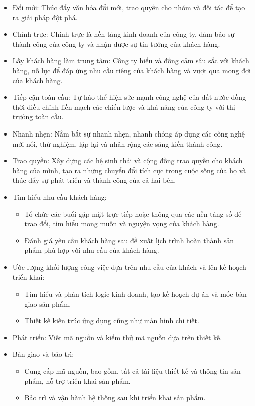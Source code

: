 \documentclass[12pt,a4paper]{report}
\begin{document}
		\hspace{0.3cm}{Nhiệm vụ: Cung cấp các dịch vụ tư vấn công nghệ đẳng cấp thế giới, giúp khách hàng chuyển đổi quy trình, thúc đẩy tăng trưởng và đạt được lợi thế cạnh tranh với các đối thủ khác ngoài thị trường.}
		
		\hspace{0.3cm}{Giá trị cốt lõi của công ty:}
		
		\begin{itemize}
		\item Đổi mới: Thúc đẩy văn hóa đổi mới, trao quyền cho nhóm và đối tác để tạo ra giải pháp đột phá.
		\item Chính trực: Chính trực là nền tảng kinh doanh của công ty, đảm bảo sự thành công của công ty và nhận được sự tin tưởng của khách hàng.
		\item Lấy khách hàng làm trung tâm: Công ty hiểu và đồng cảm sâu sắc với khách hàng, nỗ lực để đáp ứng nhu cầu riêng của khách hàng và vượt qua mong đợi của khách hàng.
		\item Tiếp cận toàn cầu: Tự hào thể hiện sức mạnh công nghệ của đất nước đồng thời điều chỉnh liền mạch các chiến lược và khả năng của công ty với thị trường toàn cầu.
		\item Nhanh nhẹn: Nắm bắt sự nhanh nhẹn, nhanh chóng áp dụng các công nghệ mới nổi, thử nghiệm, lặp lại và nhân rộng các sáng kiến thành công.
		\item Trao quyền: Xây dựng các hệ sinh thái và cộng đồng trao quyền cho khách hàng của mình, tạo ra những chuyển đổi tích cực trong cuộc sống của họ và thúc đẩy sự phát triển và thành công của cả hai bên.
		\item Tìm hiểu nhu cầu khách hàng:
			\begin{itemize}
				\item Tổ chức các buổi gặp mặt trực tiếp hoặc thông qua các nền tảng số để trao đổi, tìm hiểu mong muốn và nguyện vọng của khách hàng.
				\item Đánh giá yêu cầu khách hàng sau đề xuất lịch trình hoàn thành sản phẩm phù hợp với nhu cầu của khách hàng.
			\end{itemize}
		\item Ước lượng khối lượng công việc dựa trên nhu cầu của khách và lên kế hoạch triển khai:
			\begin{itemize}
				\item Tìm hiểu và phân tích logic kinh doanh, tạo kế hoạch dự án và mốc bàn giao sản phẩm.
				\item Thiết kế kiến trúc ứng dụng cũng như màn hình chi tiết.
			\end{itemize}
		\item Phát triển: Viết mã nguồn và kiểm thử mã nguồn dựa trên thiết kế.
		\item Bàn giao và bảo trì:
			\begin{itemize}
				\item Cung cấp mã nguồn, bao gồm, tất cả tài liệu thiết kế và thông tin sản phẩm, hỗ trợ triển khai sản phẩm.
				\item Bảo trì và vận hành hệ thống sau khi triển khai sản phẩm.
			\end{itemize}
		\end{itemize}
\end{document}
